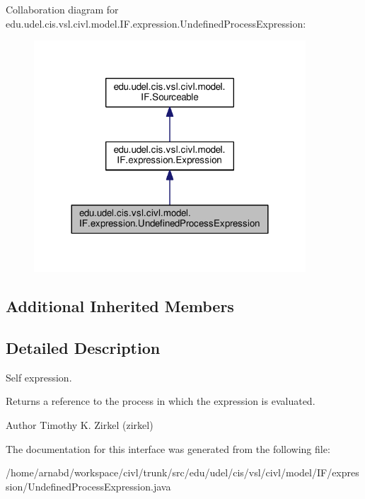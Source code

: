 Collaboration diagram for edu.\+udel.\+cis.\+vsl.\+civl.\+model.\+I\+F.\+expression.\+Undefined\+Process\+Expression\+:
\nopagebreak
\begin{figure}[H]
\begin{center}
\leavevmode
\includegraphics[width=288pt]{interfaceedu_1_1udel_1_1cis_1_1vsl_1_1civl_1_1model_1_1IF_1_1expression_1_1UndefinedProcessExpression__coll__graph}
\end{center}
\end{figure}
\subsection*{Additional Inherited Members}


\subsection{Detailed Description}
Self expression. 

Returns a reference to the process in which the expression is evaluated.

\begin{DoxyAuthor}{Author}
Timothy K. Zirkel (zirkel) 
\end{DoxyAuthor}


The documentation for this interface was generated from the following file\+:\begin{DoxyCompactItemize}
\item 
/home/arnabd/workspace/civl/trunk/src/edu/udel/cis/vsl/civl/model/\+I\+F/expression/Undefined\+Process\+Expression.\+java\end{DoxyCompactItemize}
